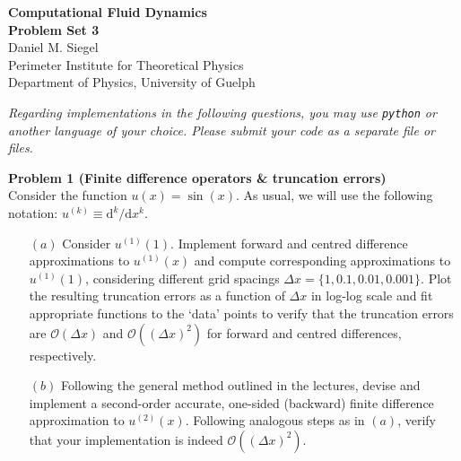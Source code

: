 \documentclass[letter,11pt]{article}
\newcommand{\drm}{\mathrm{d}}
\begin{document}
\pagestyle{problem_set}


\phantom{.}
\begin{center}
{\Large\textbf{Computational Fluid Dynamics\\[0.4cm] Problem Set 3}} \\[0.7cm]
Daniel M. Siegel \\[0.1cm]
Perimeter Institute for Theoretical Physics\\
Department of Physics, University of Guelph
\end{center}

\vspace{1cm}

\noindent \emph{Regarding implementations in the following questions, you may use \texttt{python} or another language of your choice. Please submit your code as a separate file or files.}

\vspace{1cm}

{\noindent\large\textbf{Problem 1 (Finite difference operators \& truncation errors)}}\\[0.1cm]

\noindent Consider the function $u(x) = \sin(x)$. As usual, we will use the following notation: $u^{(k)}\equiv \drm^k/\drm x^k$.

\begin{itemize}
  	\item[$(a)$] Consider $u^{(1)}(1)$. Implement forward and centred difference approximations to $u^{(1)}(x)$ and compute corresponding approximations to $u^{(1)}(1)$, considering different grid spacings $\Delta x=\{1,0.1,0.01,0.001\}$. Plot the resulting truncation errors as a function of $\Delta x$ in log-log scale and fit appropriate functions to the `data' points to verify that the truncation errors are $\mathcal{O}(\Delta x)$ and $\mathcal{O}((\Delta x)^2)$ for forward and centred differences, respectively.

  	\item[$(b)$] Following the general method outlined in the lectures, devise and implement a second-order accurate, one-sided (backward) finite difference approximation to $u^{(2)}(x)$. Following analogous steps as in $(a)$, verify that your implementation is indeed $\mathcal{O}((\Delta x)^2)$.

\end{itemize}

\vspace{1cm}
\end{document}
